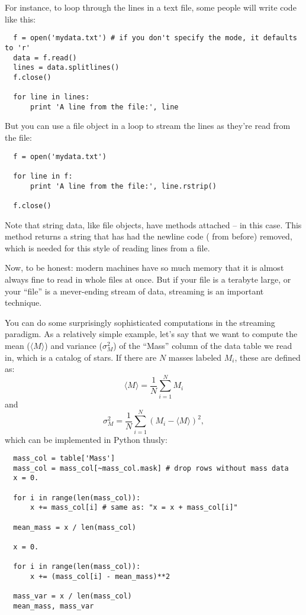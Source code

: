\documentclass[letterpaper, 12pt, titlepage, twoside]{article}
\begin{document}
For instance, to loop through the lines in a text file, some people will write
code like this:

\begin{lstlisting}
  f = open('mydata.txt') # if you don't specify the mode, it defaults to 'r'
  data = f.read()
  lines = data.splitlines()
  f.close()

  for line in lines:
      print 'A line from the file:', line
\end{lstlisting}

But you can use a file object in a  loop to stream the lines as they're
read from the file:

\begin{lstlisting}
  f = open('mydata.txt')

  for line in f:
      print 'A line from the file:', line.rstrip()

  f.close()
\end{lstlisting}

Note that string data, like file objects, have methods attached --
 in this case. This method returns a string that has had the
newline code ( from before) removed, which is needed for
this style of reading lines from a file.

Now, to be honest: modern machines have so much memory that it is almost
always fine to read in whole files at once. But if your file is a terabyte
large, or your ``file'' is a \i{never-ending} stream of data, streaming is an
important technique.

You can do some surprisingly sophisticated computations in the streaming
paradigm. As a relatively simple example, let's say that we want to compute
the mean ($\langle M\rangle$) and variance ($\sigma^2_M$) of the
``Mass'' column of the data table we read in, which is a catalog of stars.
If there are $N$ masses labeled $M_i$, these are defined as:
\[
\langle M\rangle = \frac{1}{N} \sum_{i = 1}^N M_i
\]
and
\[
\sigma^2_M = \frac{1}{N} \sum_{i = 1}^N (M_i - \langle M\rangle)^2,
\]
which can be implemented in Python thusly:

\begin{lstlisting}
  mass_col = table['Mass']
  mass_col = mass_col[~mass_col.mask] # drop rows without mass data
  x = 0.

  for i in range(len(mass_col)):
      x += mass_col[i] # same as: "x = x + mass_col[i]"

  mean_mass = x / len(mass_col)

  x = 0.

  for i in range(len(mass_col)):
      x += (mass_col[i] - mean_mass)**2

  mass_var = x / len(mass_col)
  mean_mass, mass_var
\end{lstlisting}
\end{document}
